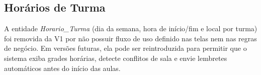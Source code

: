 \documentclass[12pt,a4paper]{article}
\begin{document}
\subsection{Horários de Turma}
A entidade \textit{Horario\_Turma} (dia da semana, hora de início/fim e local por turma) foi removida da V1 por não possuir fluxo de uso definido nas telas nem nas regras de negócio. Em versões futuras, ela pode ser reintroduzida para permitir que o sistema exiba grades horárias, detecte conflitos de sala e envie lembretes automáticos antes do início das aulas.
\end{document}
